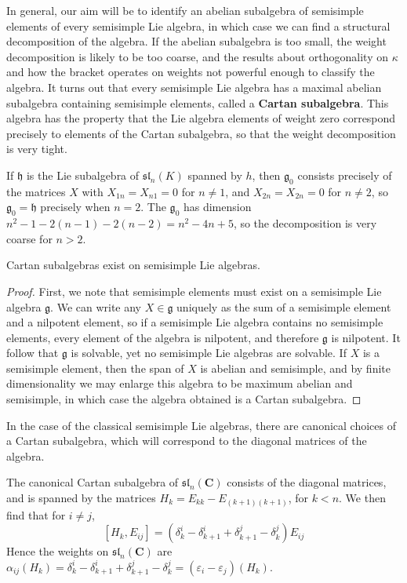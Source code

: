 In general, our aim will be to identify an abelian subalgebra of semisimple elements of every semisimple Lie algebra, in which case we can find a structural decomposition of the algebra. If the abelian subalgebra is too small, the weight decomposition is likely to be too coarse, and the results about orthogonality on $\kappa$ and how the bracket operates on weights not powerful enough to classify the algebra. It turns out that every semisimple Lie algebra has a maximal abelian subalgebra containing semisimple elements, called a {\bf Cartan subalgebra}. This algebra has the property that the Lie algebra elements of weight zero correspond precisely to elements of the Cartan subalgebra, so that the weight decomposition is very tight.

\begin{example}
    If $\mathfrak{h}$ is the Lie subalgebra of $\mathfrak{sl}_n(K)$ spanned by $h$, then $\mathfrak{g}_0$ consists precisely of the matrices $X$ with $X_{1n} = X_{n1} = 0$ for $n \neq 1$, and $X_{2n} = X_{2n} = 0$ for $n \neq 2$, so $\mathfrak{g}_0 = \mathfrak{h}$ precisely when $n = 2$. The $\mathfrak{g}_0$ has dimension $n^2 - 1 - 2(n-1) - 2(n-2) = n^2 - 4n + 5$, so the decomposition is very coarse for $n > 2$.
\end{example}

\begin{theorem}
    Cartan subalgebras exist on semisimple Lie algebras.
\end{theorem}
\begin{proof}
    First, we note that semisimple elements must exist on a semisimple Lie algebra $\mathfrak{g}$. We can write any $X \in \mathfrak{g}$ uniquely as the sum of a semisimple element and a nilpotent element, so if a semisimple Lie algebra contains no semisimple elements, every element of the algebra is nilpotent, and therefore $\mathfrak{g}$ is nilpotent. It follow that $\mathfrak{g}$ is solvable, yet no semisimple Lie algebras are solvable. If $X$ is a semisimple element, then the span of $X$ is abelian and semisimple, and by finite dimensionality we may enlarge this algebra to be maximum abelian and semisimple, in which case the algebra obtained is a Cartan subalgebra.
\end{proof}

In the case of the classical semisimple Lie algebras, there are canonical choices of a Cartan subalgebra, which will correspond to the diagonal matrices of the algebra.

\begin{example}
    The canonical Cartan subalgebra of $\mathfrak{sl}_n(\mathbf{C})$ consists of the diagonal matrices, and is spanned by the matrices $H_k = E_{kk} - E_{(k+1)(k+1)}$, for $k < n$. We then find that for $i \neq j$,
    \[ [H_k, E_{ij}] = (\delta_k^i - \delta_{k+1}^i + \delta_{k+1}^j - \delta_k^j) E_{ij} \]
    Hence the weights on $\mathfrak{sl}_n(\mathbf{C})$ are $\alpha_{ij}(H_k) = \delta_k^i - \delta_{k+1}^i + \delta_{k+1}^j - \delta_k^j = (\varepsilon_i - \varepsilon_j)(H_k)$.
\end{example}

